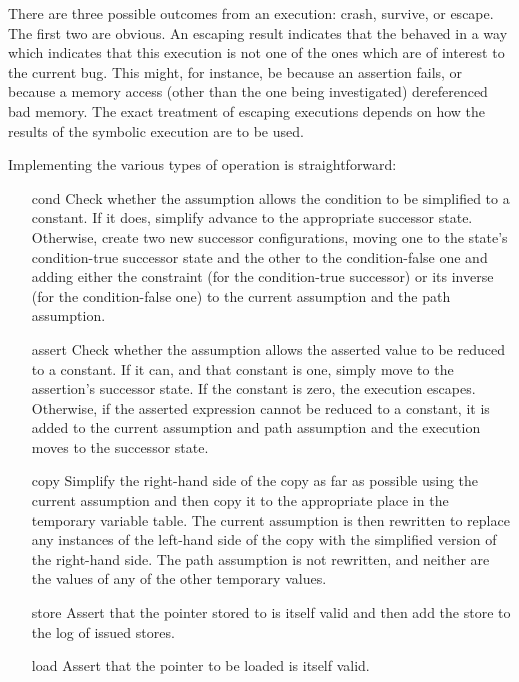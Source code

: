 There are three possible outcomes from an execution: crash, survive, or escape.
The first two are obvious.
An escaping result indicates that the \StateMachine behaved in a way which indicates that this execution is not one of the ones which are of interest to the current bug.
This might, for instance, be because an assertion fails, or because a memory access (other than the one being investigated) dereferenced bad memory.
The exact treatment of escaping executions depends on how the results of the symbolic execution are to be used.

Implementing the various types of \StateMachine operation is straightforward:

\begin{itemize}
\item[cond]
  Check whether the assumption allows the condition to be simplified to a constant.
  If it does, simplify advance to the appropriate successor state.
  Otherwise, create two new successor configurations, moving one to the state's condition-true successor state and the other to the condition-false one and adding either the constraint (for the condition-true successor) or its inverse (for the condition-false one) to the current assumption and the path assumption.
\item[assert]
  Check whether the assumption allows the asserted value to be reduced to a constant.
  If it can, and that constant is one, simply move to the assertion's successor state.
  If the constant is zero, the execution escapes.
  Otherwise, if the asserted expression cannot be reduced to a constant, it is added to the current assumption and path assumption and the execution moves to the successor state.
\item[copy]
  Simplify the right-hand side of the copy as far as possible using the current assumption and then copy it to the appropriate place in the temporary variable table.
  The current assumption is then rewritten to replace any instances of the left-hand side of the copy with the simplified version of the right-hand side.
  The path assumption is not rewritten, and neither are the values of any of the other temporary values.
\item[store]
  Assert that the pointer stored to is itself valid and then add the store to the log of issued stores.
\item[load]
  Assert that the pointer to be loaded is itself valid.

\end{itemize}
